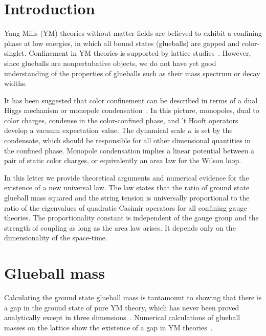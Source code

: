 \documentclass[prl,aps,
showpacs,
preprint,
nofootinbib,
floatfix,
superscriptaddress, showkeys
]{revtex4-1}
\begin{document}
\maketitle



\section{Introduction}
Yang-Mills (YM) theories without matter fields are believed to exhibit a confining phase at low energies, in which
all bound states (glueballs) are gapped and color-singlet.
Confinement in YM theories is  supported by lattice studies~\cite{Greensite:2003bk}.
However, since glueballs are nonpertubative objects, we do not have yet good understanding of the properties of glueballs 
such as their mass spectrum or decay widths. 

It has been suggested that color confinement can be described in terms of  a dual Higgs 
mechanism or monopole condensation~\cite{tHooft:1977nqb,Mandelstam:1974pi,Seiberg:1994rs}. In this picture,  
monopoles, dual to color charges, condense in the color-confined phase, and  't Hooft operators 
develop a vacuum expectation value. The dynamical scale $\kappa$ is set by the condensate, 
which should be responsible for all other dimensional quantities in the confined phase. Monopole condensation implies 
a linear potential between a pair of static color charges, or equivalently an area law for the Wilson loop. 

In this letter we provide theoretical arguments and numerical evidence for the existence of a new universal law. The law states that 
the ratio of ground state glueball mass squared and the string tension is universally proportional to the ratio of the eigenvalues of quadratic Casimir operators for all confining gauge theories. 
The proportionality constant is independent of the gauge group and the strength of coupling as long as 
the area law arises. It depends only on the dimensionality of the space-time.   

\section{Glueball mass}

Calculating the ground state glueball mass is tantamount to showing that there is a gap in the ground state of pure YM theory, 
which has never been proved analytically except in three dimensions~\cite{Karabali:1998yq}. 
Numerical calculations of  glueball masses on the  lattice show the existence of a gap in YM theories~\cite{Morningstar:1999rf,Chen:2005mg,Lucini:2004my,Lucini:2012gg,Athenodorou:2016ebg,Athenodorou:2015nba,Lau:2015cna,Lau:2017aom}. 
\end{document}
